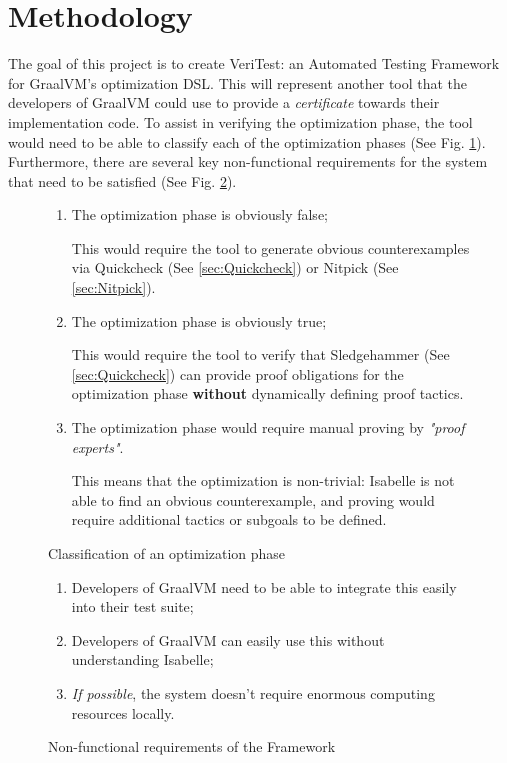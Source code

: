 \section{Methodology}
\label{sec:Methodology}

The goal of this project is to create VeriTest: an Automated Testing Framework for GraalVM's optimization DSL. This will represent another 
tool that the developers of GraalVM could use to provide a \emph{certificate} towards their implementation code. To assist in verifying the 
optimization phase, the tool would need to be able to classify each of the optimization phases (See Fig. \ref{fig:classification}). Furthermore, 
there are several key non-functional requirements for the system that need to be satisfied (See Fig. \ref{fig:requirements}).

\begin{figure}[h]
      \label{fig:classification}
      \begin{enumerate}
            \item The optimization phase is obviously false;
            
                  This would require the tool to generate obvious counterexamples via Quickcheck (See \ref{sec:Quickcheck}) or Nitpick 
                  (See \ref{sec:Nitpick}).
        
            \item The optimization phase is obviously true;
            
                  This would require the tool to verify that Sledgehammer (See \ref{sec:Quickcheck}) can provide proof obligations for the 
                  optimization phase \textbf{without} dynamically defining proof tactics.
        
            \item The optimization phase would require manual proving by \emph{"proof experts"}.
                  
                  This means that the optimization is non-trivial: Isabelle is not able to find an obvious counterexample, and proving would require 
                  additional tactics or subgoals to be defined.
      \end{enumerate}
      \caption{Classification of an optimization phase}
\end{figure}

\begin{figure}[h]
      \label{fig:requirements}
      \begin{enumerate}
            \item Developers of GraalVM need to be able to integrate this easily into their test suite;
            \item Developers of GraalVM can easily use this without understanding Isabelle;
            \item \emph{If possible}, the system doesn't require enormous computing resources locally.
      \end{enumerate}
      \caption{Non-functional requirements of the Framework}
\end{figure}

